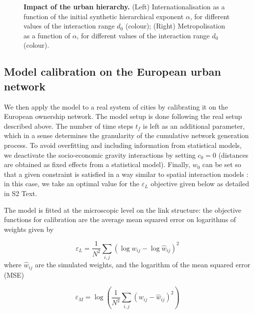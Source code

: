 \documentclass[10pt,letterpaper]{article}
\begin{document}
\begin{figure}
    \begin{center}
    \end{center}
    \caption{\textbf{Impact of the urban hierarchy.} (Left) Internationalisation as a function of the initial synthetic hierarchical exponent $\alpha$, for different values of the interaction range $d_0$ (colour); (Right) Metropolisation as a function of $\alpha$, for different values of the interaction range $d_0$ (colour).\label{fig:fig7}}
\end{figure}



\subsection*{Model calibration on the European urban network}

We then apply the model to a real system of cities by calibrating it on the European ownership network. The model setup is done following the real setup described above. The number of time steps $t_f$ is left as an additional parameter, which in a sense determines the granularity of the cumulative network generation process. To avoid overfitting and including information from statistical models, we deactivate the socio-economic gravity interactions by setting $c_0 = 0$ (distances are obtained as fixed effects from a statistical model). Finally, $w_0$ can be set so that a given constraint is satisfied in a way similar to spatial interaction models \cite{wilson1975some}: in this case, we take an optimal value for the $\varepsilon_L$ objective given below as detailed in S2 Text.

The model is fitted at the microscopic level on the link structure: the objective functions for calibration are the average mean squared error on logarithms of weights given by

\begin{equation}
\varepsilon_L = \frac{1}{N^2} \sum_{i,j} \left(\log w_{ij} - \log \hat{w}_{ij} \right)^2
\end{equation}
where $\hat{w}_{ij}$ are the simulated weights, and the logarithm of the mean squared error (MSE)

\begin{equation}
\varepsilon_M = \log\left(\frac{1}{N^2} \sum_{i,j} \left(w_{ij} - \hat{w}_{ij}\right)^2 \right)
\end{equation}
\end{document}
